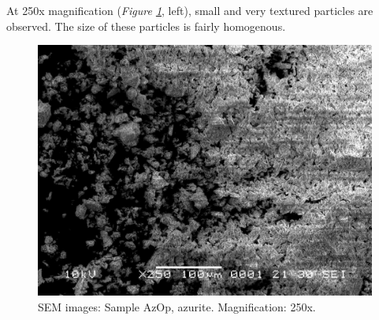 At 250x magnification (\textit{Figure \ref{fig:azop_sem_2}}, left), small and very textured particles are observed. The size of these particles is fairly homogenous. 

\begin{figure}[H]
\centering
  \includegraphics[width=\linewidth]{AzOp_x250_1_150321}
\caption[SEM images: Sample AzOp, azurite]{SEM images: Sample AzOp, azurite. Magnification: 250x.}
\label{fig:azop_sem_2}
\end{figure}

